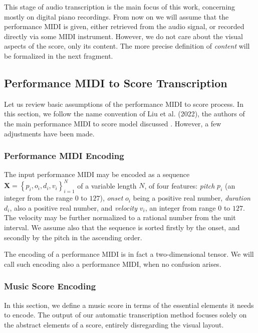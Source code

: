 This stage of audio transcription is the main focus of this work, concerning mostly on digital piano recordings. From now on we will assume that the performance MIDI is given, either retrieved from the audio signal, or recorded directly via some MIDI instrument. However, we do not care about the visual aspects of the score, only its content. The more precise definition of \emph{content} will be formalized in the next fragment.

\subsection{Performance MIDI to Score Transcription}

Let us review basic assumptions of the performance MIDI to score process. In this section, we follow the name convention of Liu et al. (2022), the authors of the main performance MIDI to score model discussed \cite{Liu2022}. However, a few adjustments have been made.

\subsubsection{Performance MIDI Encoding}

The input performance MIDI may be encoded as a sequence $\mathbf{X}=\left\{p_i,o_i,d_i,v_i\right\}_{i=1}^N$ of a variable length $N$, of four features: \emph{pitch} $p_i$ (an integer from the range $0$ to $127$), \emph{onset} $o_i$ being a positive real number, \emph{duration} $d_i$, also a positive real number, and \emph{velocity} $v_i$, an integer from range $0$ to $127$. The velocity may be further normalized to a rational number from the unit interval. We assume also that the sequence is sorted firstly by the onset, and secondly by the pitch in the ascending order.

The encoding of a performance MIDI is in fact a two-dimensional tensor. We will call such encoding also a performance MIDI, when no confusion arises.

\subsubsection{Music Score Encoding} \label{music_score_encoding}

In this section, we define a music score in terms of the essential elements it needs to encode. The output of our automatic transcription method focuses solely on the abstract elements of a score, entirely disregarding the visual layout.

